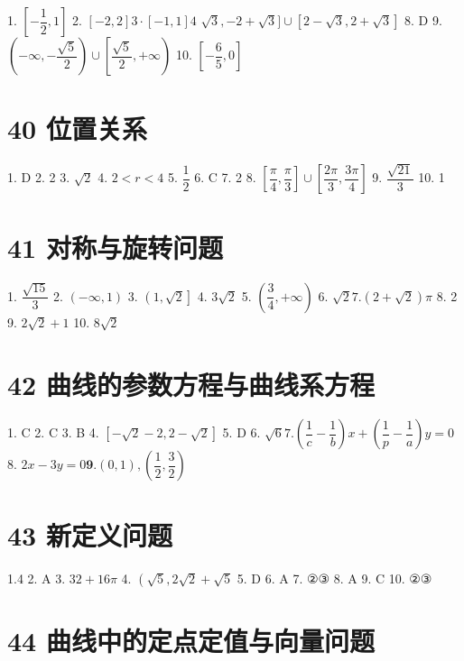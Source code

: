 \documentclass[10pt]{article}
\begin{document}
1. $\left\lbrack  {-\dfrac{1}{2},1}\right\rbrack$ 2. $\left\lbrack  {-2,2}\right\rbrack  3 \cdot  \left\lbrack  {-1,1}\right\rbrack  4$  $\sqrt{3}, - 2 + \sqrt{3}\rbrack  \cup  \left\lbrack  {2 - \sqrt{3},2 + \sqrt{3}}\right\rbrack  $ 8. D 9. $\left( {-\infty , - \dfrac{\sqrt{5}}{2}}\right)  \cup  \left\lbrack  {\dfrac{\sqrt{5}}{2}, + \infty }\right) $ 10. $\left\lbrack  {-\dfrac{6}{5},0}\right\rbrack$

\section*{40 位置关系}

1. D 2. 2 3. $\sqrt{2}$ 4. $2 < r < 4$ 5. $\dfrac{1}{2}$ 6. C 7. 2 8. $\left\lbrack  {\dfrac{\pi }{4},\dfrac{\pi }{3}}\right\rbrack   \cup  \left\lbrack  {\dfrac{2\pi }{3},\dfrac{3\pi }{4}}\right\rbrack  $ 9. $\dfrac{\sqrt{21}}{3}$ 10. 1

\section*{41 对称与旋转问题}

1. $\dfrac{\sqrt{15}}{3}$ 2. $\left( {-\infty ,1}\right)$ 3. $\left( {1,\sqrt{2}}\right\rbrack$ 4. $3\sqrt{2}$ 5. $\left( {\dfrac{3}{4}, + \infty }\right)$ 6. $\sqrt{2}7.\left( {2 + \sqrt{2}}\right) \pi$ 8. 2 9. $2\sqrt{2} + 1$ 10. $8\sqrt{2}$

\section*{42 曲线的参数方程与曲线系方程}

1. C 2. C 3. B 4. $\left\lbrack  {-\sqrt{2} - 2,2 - \sqrt{2}}\right\rbrack  $ 5. D 6. $\sqrt{6}7.\left( {\dfrac{1}{c} - \dfrac{1}{b}}\right) x + \left( {\dfrac{1}{p} - \dfrac{1}{a}}\right) y = 0$ 8. ${2x} - {3y} = 0\mathbf{9}.\left( {0,1}\right) ,\left( {\dfrac{1}{2},\dfrac{3}{2}}\right)$

\section*{43 新定义问题}

1.4 2. A 3. ${32} + {16\pi }$ 4. $\left( {\sqrt{5},2\sqrt{2} + \sqrt{5}}\right.$ 5. D 6. A 7. ②③ 8. A 9. C 10. ②③

\section*{44 曲线中的定点定值与向量问题}
\end{document}
